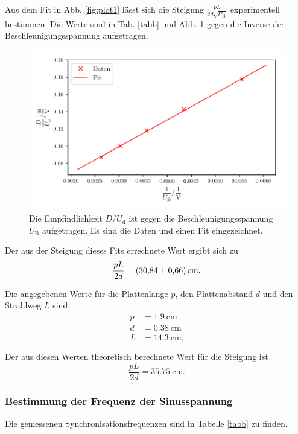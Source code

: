 \noindent Aus dem Fit in Abb. \ref{fig:plot1} lässt sich die Steigung  
$\frac{p L}{2 d \sqrt{U_\text{B}}}$ experimentell bestimmen.
Die Werte sind in Tab. \ref{tabb} und Abb. \ref{fig:plot5} gegen die Inverse der Beschleunigungsspannung aufgetragen.



\begin{figure}
    \centering
    \includegraphics[width=12cm, height=7cm]{build/plot5.pdf}
    \caption{Die Empfindlichkeit $D/U_\text{d}$ ist gegen die Beschleunigungsspannung $U_\text{B}$ aufgetragen. Es sind die Daten und einen Fit eingezeichnet.}
    \label{fig:plot5}
\end{figure}

\noindent Der aus der Steigung dieses Fits errechnete Wert ergibt sich zu
\begin{equation*}
    \frac{p L}{2 d} = \SI{30.84 \pm 0.66}{\centi\meter}.
\end{equation*}

\noindent Die angegebenen Werte für die Plattenlänge $p$,
den Plattenabstand $d$ und den Strahlweg $L$ sind
\begin{align*}
    p &= \SI{1.9}{\centi\meter} \\
    d &= \SI{0.38}{\centi\meter} \\
    L &= \SI{14.3}{\centi\meter}.
\end{align*}

\noindent Der aus diesen Werten theoretisch berechnete Wert für die
Steigung ist
\begin{equation*}
    \frac{p L}{2 d} = \SI{35.75}{\centi\meter}.
\end{equation*}

\subsubsection{Bestimmung der Frequenz der Sinusspannung}
Die gemessenen Synchronisationsfrequenzen sind in Tabelle
\ref{tabb} zu finden. 


